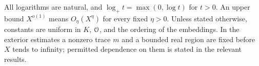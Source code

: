 All logarithms are natural, and $\log_+t=\max(0,\log t)$ for $t>0$.
An upper bound $X^{o(1)}$ means $O_\eta(X^\eta)$ for every fixed $\eta>0$.
Unless stated otherwise, constants are uniform in $K$, $\mathcal O$, and the
ordering of the embeddings.  In the exterior estimates a nonzero trace $m$
and a bounded real region are fixed before $X$ tends to infinity; permitted
dependence on them is stated in the relevant results.
